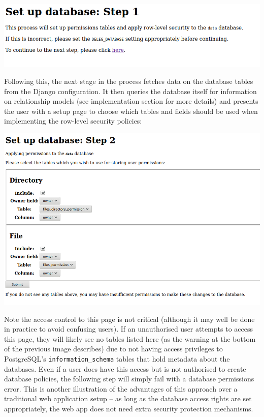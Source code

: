 \documentclass{report}
\begin{document}
\begin{center}
  \includegraphics[scale=0.5]{02-setup1.png}
\end{center}

Following this, the next stage in the process fetches data on the database tables from the Django configuration. It then queries the database itself for information on relationship models (see implementation section for more details) and presents the user with a setup page to choose which tables and fields should be used when implementing the row-level security policies:

\begin{center}
  \includegraphics[width=\textwidth]{03-setup2.png}
\end{center}

Note the access control to this page is not critical (although it may well be done in practice to avoid confusing users). If an unauthorised user attempts to access this page, they will likely see no tables listed here (as the warning at the bottom of the previous image describes) due to not having access privileges to PostgreSQL's \verb+information_schema+ tables that hold metadata about the databases. Even if a user does have this access but is not authorised to create database policies, the following step will simply fail with a database permissions error. This is another illustration of the advantages of this approach over a traditional web application setup -- as long as the database access rights are set appropriately, the web app does not need extra security protection mechanisms.
\end{document}
